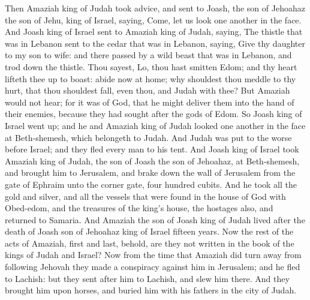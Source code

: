 Then Amaziah king of Judah took advice, and sent to Joash, the son of Jehoahaz the son of Jehu, king of Israel, saying, Come, let us look one another in the face. And Joash king of Israel sent to Amaziah king of Judah, saying, The thistle that was in Lebanon sent to the cedar that was in Lebanon, saying, Give thy daughter to my son to wife: and there passed by a wild beast that was in Lebanon, and trod down the thistle. Thou sayest, Lo, thou hast smitten Edom; and thy heart lifteth thee up to boast: abide now at home; why shouldest thou meddle to thy hurt, that thou shouldest fall, even thou, and Judah with thee?  But Amaziah would not hear; for it was of God, that he might deliver them into the hand of their enemies, because they had sought after the gods of Edom. So Joash king of Israel went up; and he and Amaziah king of Judah looked one another in the face at Beth-shemesh, which belongeth to Judah. And Judah was put to the worse before Israel; and they fled every man to his tent. And Joash king of Israel took Amaziah king of Judah, the son of Joash the son of Jehoahaz, at Beth-shemesh, and brought him to Jerusalem, and brake down the wall of Jerusalem from the gate of Ephraim unto the corner gate, four hundred cubits. And he took all the gold and silver, and all the vessels that were found in the house of God with Obed-edom, and the treasures of the king’s house, the hostages also, and returned to Samaria.  And Amaziah the son of Joash king of Judah lived after the death of Joash son of Jehoahaz king of Israel fifteen years. Now the rest of the acts of Amaziah, first and last, behold, are they not written in the book of the kings of Judah and Israel? Now from the time that Amaziah did turn away from following Jehovah they made a conspiracy against him in Jerusalem; and he fled to Lachish: but they sent after him to Lachish, and slew him there. And they brought him upon horses, and buried him with his fathers in the city of Judah. 

